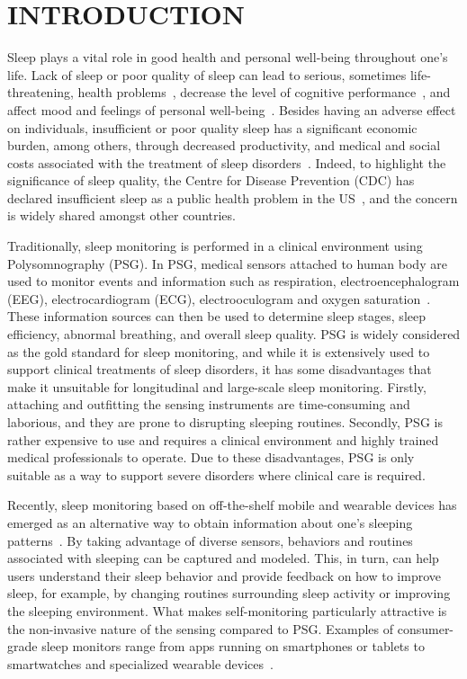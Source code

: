 \section{INTRODUCTION}\label{sec:1introduction}

Sleep plays a vital role in good health and personal well-being throughout one's life. Lack of sleep or poor quality of sleep can lead to
serious, sometimes life-threatening, health problems~\cite{altena2008sleep,chandola2010effect,lallukka2016contribution}, decrease the level of
cognitive performance~\cite{alhola07sleep,akerstedt07altered}, and affect mood and feelings of personal
well-being~\cite{paunio09longitudinal,pilcher97sleep}. Besides having an adverse effect on individuals, insufficient or poor quality sleep
has a significant economic burden, among others, through decreased productivity, and medical and social costs associated with the treatment of
sleep disorders~\cite{hafner17why}. Indeed, to highlight the significance of sleep quality, the Centre for Disease Prevention (CDC) has
declared insufficient sleep as a public health problem in the US~\cite{sleepreport}, and the concern is widely shared amongst other countries.


Traditionally, sleep monitoring is performed in a clinical environment using Polysomnography (PSG). In PSG, medical
sensors attached to human body are used to monitor events and information such as respiration, electroencephalogram (EEG), electrocardiogram (ECG), electrooculogram and oxygen saturation~\cite{ebrahimi2008automatic,saper2005hypothalamic,oropesa1999sleep,langkvist2012sleep}. These information sources can then be used to determine sleep stages, sleep efficiency, abnormal breathing, and overall sleep quality. PSG is widely considered as the gold standard for sleep monitoring, and while it is extensively used to support clinical treatments of sleep disorders, it has some disadvantages that make it unsuitable for longitudinal and large-scale sleep monitoring. Firstly, {attaching and outfitting} the sensing instruments are time-consuming and laborious, and they are prone to disrupting sleeping routines. Secondly, PSG is rather expensive to use and requires a clinical environment and highly trained medical professionals to operate. Due to these disadvantages, PSG is only suitable as a way to support severe disorders {where} clinical care is required.

Recently, sleep monitoring based on off-the-shelf mobile and wearable devices has emerged as an alternative way to obtain information about one's sleeping patterns~\cite{ko15consumer,shelgikar2016sleep}. By taking advantage of diverse sensors, behaviors and routines associated with sleeping can be captured and modeled. This, in turn, can help users understand their sleep behavior and provide feedback on how to improve sleep, for example, by changing routines surrounding sleep activity or improving the sleeping environment. What makes self-monitoring particularly attractive is the non-invasive nature of the sensing compared to PSG. Examples of consumer-grade sleep monitors range from apps running on smartphones or tablets to smartwatches and specialized wearable devices~\cite{zeo,Jawbone,SleepAndroid,fitbit,gu2016sleep,sleepmonitor}.

